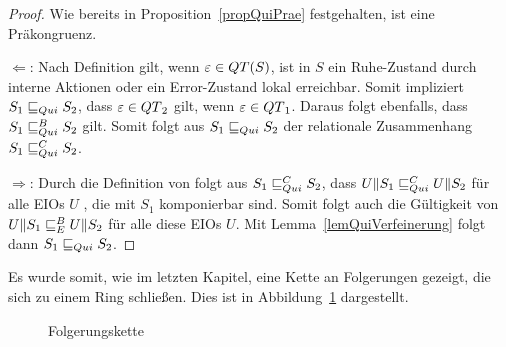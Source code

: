 \begin{proof}
  Wie bereits in Proposition~\ref{propQuiPrae} festgehalten, ist \QRel{} eine
  Präkongruenz.

  \glqq{}$\Leftarrow$\grqq{}: Nach Definition gilt, wenn
  $\varepsilon\in QT{}(S)$, ist in $S$ ein Ruhe-Zustand durch interne Aktionen
  oder ein Error-Zustand lokal erreichbar. Somit impliziert $S_1\sqsubseteq _{Qui} S_2$,
  dass $\varepsilon\in QT{}_2$ gilt, wenn $\varepsilon\in QT{}_1$. Daraus folgt
  ebenfalls, dass $S_1\sqsubseteq _{Qui}^B S_2$ gilt. Somit folgt aus $S_1\sqsubseteq _{Qui} S_2$ der
  relationale Zusammenhang $S_1\sqsubseteq _{Qui}^C S_2$.

  \glqq{}$\Rightarrow$\grqq{}: Durch die Definition von \QCRel{} folgt aus
  $S_1\sqsubseteq _{Qui}^C{} S_2$, dass $U\|S_1\sqsubseteq _{Qui}^C U\|S_2$ für alle EIOs $U$ , die mit
  $S_1$ komponierbar sind. Somit folgt auch die Gültigkeit von $U\|S_1\sqsubseteq _E^B
  U\|S_2$ für alle diese EIOs $U$. Mit Lemma~\ref{lemQuiVerfeinerung} folgt
  dann $S_1\sqsubseteq _{Qui}{} S_2$.
\end{proof}

Es wurde somit, wie im letzten Kapitel, eine Kette an Folgerungen gezeigt, die
sich zu einem Ring schließen. Dies ist in Abbildung~\ref{FolgerungsketteQui}
dargestellt.

\begin{figure}[h!tbp]
  \begin{center}
    \caption{Folgerungskette}
    \label{FolgerungsketteQui}
  \end{center}
\end{figure}


